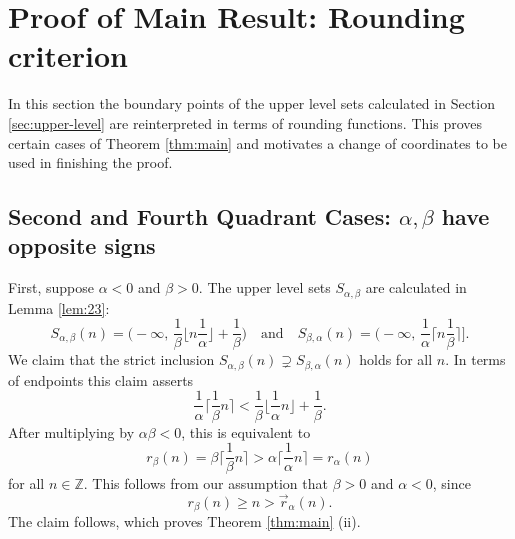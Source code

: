 \documentclass[12pt,letterpaper, reqno]{amsart}
\theoremstyle{definition}
\theoremstyle{remark}
\newcommand{\ZZ}{\ensuremath{\mathbb{Z}}}
\newcommand{\floor}[1]{\lfloor{#1}\rfloor}
\newcommand{\ceil}[1]{\lceil{#1}\rceil}
\newcommand{\tround}{\vec{r}}
\newcommand{\round}{r}
\begin{document}
\section{Proof  of Main Result: Rounding criterion}\label{sec:rounding}
\setcounter{equation}{0}

In this section the boundary points of the upper level sets calculated in Section \ref{sec:upper-level} are  reinterpreted in terms of rounding functions.
This proves certain cases of Theorem \ref{thm:main} and motivates a change of coordinates to be used in finishing the proof.



\subsection{Second and Fourth Quadrant Cases: $\alpha, \beta$ have opposite signs}\label{sec:31}
First, suppose $\alpha<0$ and $\beta>0$.
The upper level sets $S_{\alpha,\beta}$ are calculated in Lemma \ref{lem:23}:
\[ S_{\alpha,\beta}(n)  = \bigg(-\infty, \, \frac1\beta \floor{n\frac1\alpha} +\frac1\beta\bigg)
\quad\text{and}\quad
 S_{\beta,\alpha}(n) = \bigg(-\infty, \,\frac1\alpha \ceil{n\frac1\beta}\bigg] 
.\]
We claim that the strict inclusion $S_{\alpha,\beta}(n)\supsetneq S_{\beta,\alpha}(n)$ holds for all $n$.
In  terms of endpoints this claim asserts
\[ 
 \frac1\alpha \ceil{\frac{1}{\beta} n} < \frac1\beta \floor{\frac{1}{\alpha} n} +\frac1\beta .\]
After multiplying by $\alpha\beta<0$, this is equivalent to
\[ r_\beta(n) = \beta \ceil{\frac{1}{\beta} n} > \alpha \ceil{\frac{1}{\alpha} n} = \round_\alpha(n)\]
for all $n\in\ZZ$.
This follows from our assumption that $\beta>0$ and $\alpha<0$, since
\[ r_\beta(n) \geq n > \tround_\alpha(n).\]
The claim follows, which proves Theorem \ref{thm:main} (ii).
\end{document}
